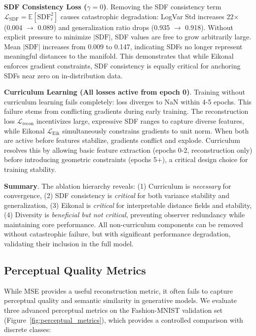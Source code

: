 \documentclass[10pt,twocolumn,letterpaper]{article}
\begin{document}
\textbf{SDF Consistency Loss ($\gamma = 0$)}. Removing the SDF consistency term $\mathcal{L}_{\text{SDF}} = \mathbb{E}[\text{SDF}_i^2]$ causes catastrophic degradation: LogVar Std increases 22$\times$ (0.004 $\to$ 0.089) and generalization ratio drops (0.935 $\to$ 0.918). Without explicit pressure to minimize $|\text{SDF}|$, SDF values are free to grow arbitrarily large. Mean $|\text{SDF}|$ increases from 0.009 to 0.147, indicating SDFs no longer represent meaningful distances to the manifold. This demonstrates that while Eikonal enforces gradient constraints, SDF consistency is equally critical for anchoring SDFs near zero on in-distribution data.

\textbf{Curriculum Learning (All losses active from epoch 0)}. Training without curriculum learning fails completely: loss diverges to NaN within 4-5 epochs. This failure stems from conflicting gradients during early training. The reconstruction loss $\mathcal{L}_{\text{recon}}$ incentivizes large, expressive SDF ranges to capture diverse features, while Eikonal $\mathcal{L}_{\text{Eik}}$ simultaneously constrains gradients to unit norm. When both are active before features stabilize, gradients conflict and explode. Curriculum resolves this by allowing basic feature extraction (epochs 0-2, reconstruction only) before introducing geometric constraints (epochs 5+), a critical design choice for training stability.

\textbf{Summary}. The ablation hierarchy reveals: (1) Curriculum is \textit{necessary} for convergence, (2) SDF consistency is \textit{critical} for both variance stability and generalization, (3) Eikonal is \textit{critical} for interpretable distance fields and stability, (4) Diversity is \textit{beneficial but not critical}, preventing observer redundancy while maintaining core performance. All non-curriculum components can be removed without catastrophic failure, but with significant performance degradation, validating their inclusion in the full model.

\subsection{Perceptual Quality Metrics}

While MSE provides a useful reconstruction metric, it often fails to capture perceptual quality and semantic similarity in generative models. We evaluate three advanced perceptual metrics on the Fashion-MNIST validation set (Figure~\ref{fig:perceptual_metrics}), which provides a controlled comparison with discrete classes:
\end{document}
